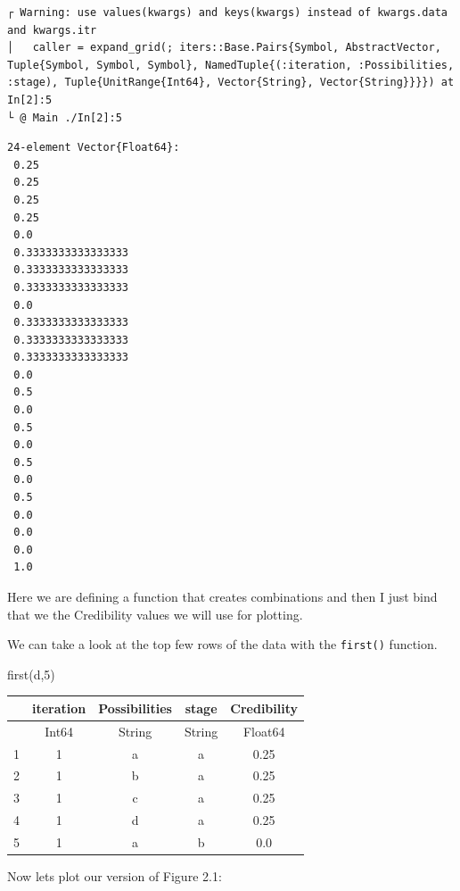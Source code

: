 \documentclass[
  letterpaper,
  DIV=11,
  numbers=noendperiod]{scrreprt}
\newenvironment{Shaded}{\begin{snugshade}}{\end{snugshade}}
\newcommand{\FloatTok}[1]{\textcolor[rgb]{0.68,0.00,0.00}{#1}}
\newcommand{\FunctionTok}[1]{\textcolor[rgb]{0.28,0.35,0.67}{#1}}
\newcommand{\NormalTok}[1]{\textcolor[rgb]{0.00,0.23,0.31}{#1}}
\begin{document}
\begin{verbatim}
┌ Warning: use values(kwargs) and keys(kwargs) instead of kwargs.data and kwargs.itr
│   caller = expand_grid(; iters::Base.Pairs{Symbol, AbstractVector, Tuple{Symbol, Symbol, Symbol}, NamedTuple{(:iteration, :Possibilities, :stage), Tuple{UnitRange{Int64}, Vector{String}, Vector{String}}}}) at In[2]:5
└ @ Main ./In[2]:5
\end{verbatim}

\begin{verbatim}
24-element Vector{Float64}:
 0.25
 0.25
 0.25
 0.25
 0.0
 0.3333333333333333
 0.3333333333333333
 0.3333333333333333
 0.0
 0.3333333333333333
 0.3333333333333333
 0.3333333333333333
 0.0
 0.5
 0.0
 0.5
 0.0
 0.5
 0.0
 0.5
 0.0
 0.0
 0.0
 1.0
\end{verbatim}

Here we are defining a function that creates combinations and then I
just bind that we the Credibility values we will use for plotting.

We can take a look at the top few rows of the data with the
\texttt{first()} function.

\begin{Shaded}
\begin{Highlighting}[]
\FunctionTok{first}\NormalTok{(d,}\FloatTok{5}\NormalTok{)}
\end{Highlighting}
\end{Shaded}

\begin{tabular}{r|cccc}
    & iteration & Possibilities & stage & Credibility\\
    \hline
    & Int64 & String & String & Float64\\
    \hline
    1 & 1 & a & a & 0.25 \\
    2 & 1 & b & a & 0.25 \\
    3 & 1 & c & a & 0.25 \\
    4 & 1 & d & a & 0.25 \\
    5 & 1 & a & b & 0.0 \\
\end{tabular}

Now lets plot our version of Figure 2.1:
\end{document}
